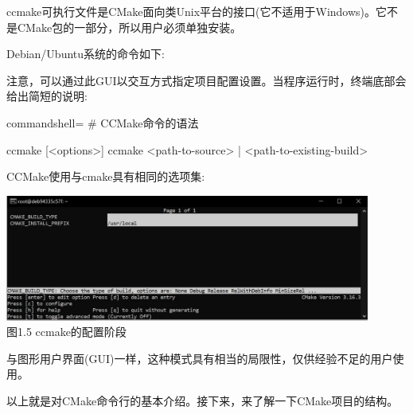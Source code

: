 
ccmake可执行文件是CMake面向类Unix平台的接口(它不适用于Windows)。它不是CMake包的一部分，所以用户必须单独安装。
 
Debian/Ubuntu系统的命令如下:
 
 
注意，可以通过此GUI以交互方式指定项目配置设置。当程序运行时，终端底部会给出简短的说明:
 
\begin{tcblisting}{commandshell={}}
# CCMake命令的语法

ccmake [<options>]
ccmake {<path-to-source> | <path-to-existing-build>}
\end{tcblisting}
 
CCMake使用与cmake具有相同的选项集:
 
\begin{center}
\includegraphics[width=0.9\textwidth]{content/1/chapter1/images/5.jpg}\\
图1.5  ccmake的配置阶段
\end{center}
 
与图形用户界面(GUI)一样，这种模式具有相当的局限性，仅供经验不足的用户使用。

以上就是对CMake命令行的基本介绍。接下来，来了解一下CMake项目的结构。
 
 
 
 
 
 
 
 
 
 
 
 
 
 
 
 
